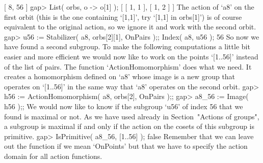 [ 8, 56 ]
gap> List( orbs, o -> o[1] );
[ [ 1, 1 ], [ 1, 2 ] ]
\endexample
The action of `a8'   on the first  orbit (this  is the one  containing
`[1,1]', try `[1,1] in orbs[1]') is of  course equivalent to the original
action, so we ignore it and work with the second orbit.
\beginexample
gap> u56 := Stabilizer( a8, orbs[2][1], OnPairs );; Index( a8, u56 );
56 
\endexample
So   now   we have  found   a  second subgroup.   To   make the following
computations a little bit easier and more efficient  we would now like to
work on the points `[1..56]'  instead of the list  of pairs. The function
`ActionHomomorphism' does what  we need.   It creates a   homomorphism
defined on `a8' whose image is a new group  that operates on `[1..56]' in
the same way that `a8' operates on the second orbit.
\beginexample
gap> h56 := ActionHomomorphism( a8, orbs[2], OnPairs );;
gap> a8_56 := Image( h56 );;
\endexample
We would now like to know if the subgroup `u56' of index 56 that we found
is  maximal or  not.
As we have used already in Section~"Actions of groups",
a subgroup is maximal if and only if the action on the cosets of this
subgroup is primitive.
\beginexample
gap> IsPrimitive( a8_56, [1..56] );
false 
\endexample
Remember that we  can leave out the  function  if we mean  `OnPoints' but
that we have to specify the action domain for all action functions.

%

